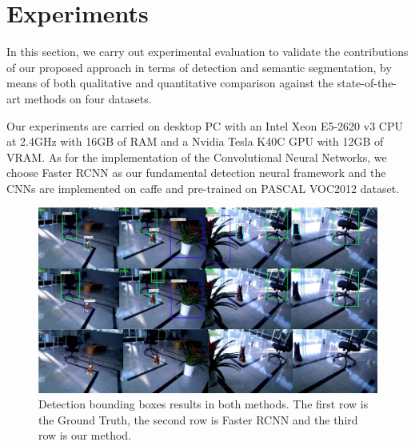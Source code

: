 \documentclass[conference]{IEEEtran}
\begin{document}
\section{\textbf{Experiments}}

In this section, we carry out experimental evaluation to validate the contributions of our proposed approach in terms of detection and semantic segmentation, by means of both qualitative and quantitative comparison against the state-of-the-art methods on four datasets.

Our experiments are carried on desktop PC with an Intel Xeon E5-2620 v3 CPU  at 2.4GHz with 16GB of RAM and a Nvidia Tesla K40C GPU with 12GB of VRAM. As for the implementation of the Convolutional Neural Networks, we choose Faster RCNN as our fundamental detection neural framework and the CNNs are implemented on caffe \cite{Jia2014} and pre-trained on PASCAL VOC2012 \cite{Hoiem}dataset.


\begin{figure}[htbp]
	\centering
	\includegraphics[width=1\textwidth]{pic/fig6.eps}
	\centering
	\caption{ {\color{blue}Detection bounding boxes results in both methods. The first row is the Ground Truth, the second row is Faster RCNN and the third row is our method.}}
	\label{fig:fig_detection}
\end{figure}
\end{document}
